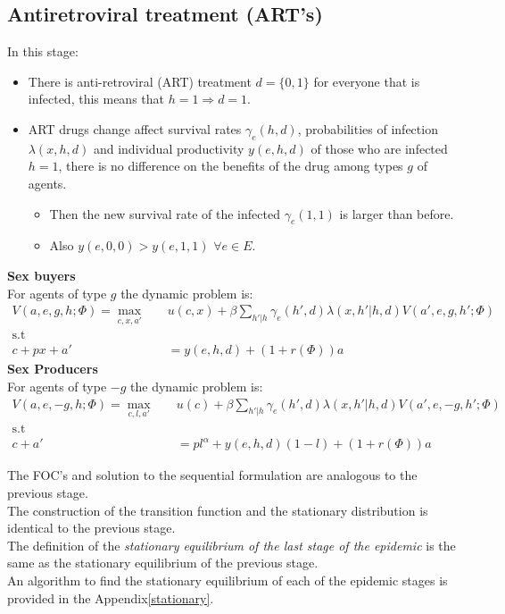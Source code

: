 \subsection{Antiretroviral treatment (ART's)}\label{arts}
In this stage:
\begin{itemize}
\item There is anti-retroviral (ART) treatment $d=\{0,1\}$ for everyone that is infected, this means that $h=1\Rightarrow d=1$. 
\item  ART drugs change affect survival rates $\gamma_{e}(h,d)$, probabilities of infection $\lambda(x,h,d)$ and individual productivity $y(e,h,d)$ of those who are infected $h=1$, there is no difference on the benefits of the drug among types $g$ of agents.
\begin{itemize}
\item Then the new survival rate of the infected $\gamma_{e}(1,1)$ is larger than before.
\item Also $y(e,0,0)>y(e,1,1)\,\,\forall e\in E$.

\end{itemize}
\end{itemize}

\noindent\textbf{Sex buyers}\\
For agents of type $g$ the dynamic problem is: 
 \begin{align*}
V(a,e,g,h;\Phi) = \max_{c,x,a'} \quad  & u(c,x) + \beta \sum_{h'|h} \gamma_e(h',d) \lambda(x,h'|h,d) V(a',e,g,h';\Phi)\\
\mbox{s.t}\\
c+ px +a'&= y(e,h,d) + (1+r(\Phi))a 
\end{align*}
\noindent\textbf{Sex Producers}\\
For agents of type $-g$ the dynamic problem is: 
 \begin{align*}
V(a,e,-g,h;\Phi) = \max_{c,l,a'} \quad &  u(c) + \beta  \sum_{h'|h} \gamma_e(h',d) \lambda(x,h'|h,d)  V(a',e,-g,h';\Phi)\\
\mbox{s.t}\\
c +a'&= pl^{\alpha} + y(e,h,d)(1-l) + (1+r(\Phi))a   
\end{align*}

The FOC's and solution to the sequential formulation are analogous to the previous stage.\\
The construction of the transition function and the stationary distribution is identical to the previous stage.\\
The definition of the \textit{stationary equilibrium of the last stage of the epidemic} is the same as the stationary equilibrium of the previous stage.\\
An algorithm to find the stationary equilibrium of each of the epidemic stages is provided in the Appendix\ref{stationary}.
\newpage
